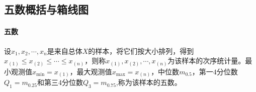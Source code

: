     \subsection{五数概括与箱线图}
    \paragraph{五数}
    设$x_1,x_2,\cdots,x_n$是来自总体$X$的样本，将它们按大小排列，得到$x_{(1)}\leq x_{(2)}\leq \cdots \leq x_{(n)}$，则称$x_{(1)},x_{(2)},\cdots,x_{(n)}$为该样本的次序统计量。最小观测值$x_{\min}=x_{(1)}$，最大观测值$x_{\max}=x_{(n)}$，中位数$m_{0.5}$，第一$4$分位数$Q_1=m_{0.25}$和第三$4$分位数$Q_3=m_{0.75}$,称为该样本的五数。



